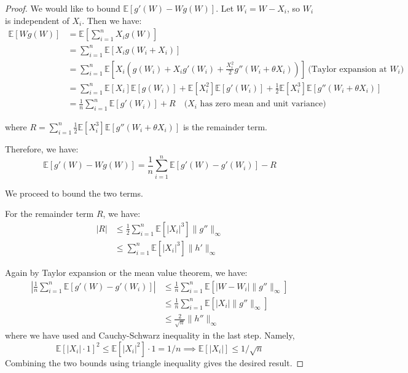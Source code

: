 \documentclass{article}
\begin{document}
\begin{proof}
    We would like to bound $\mathbb{E}[g'(W)-Wg(W)]$. Let $W_i = W - X_i$, so $W_i$ is independent of $X_i$. Then we have:
    \begin{align*}
        \mathbb{E}[Wg(W)] &= \mathbb{E}[\sum_{i=1}^{n} X_i g(W)]\\
        &= \sum_{i=1}^{n} \mathbb{E}[X_i g(W_i + X_i)]\\
        &= \sum_{i=1}^{n} \mathbb{E}[X_i (g(W_i) + X_i g'(W_i) + \frac{X_i^2}{2} g''(W_i +\theta X_i))] \ \text{(Taylor expansion at $W_i$)}
        \\
        &= \sum_{i=1}^{n} \mathbb{E}[X_i] \mathbb{E}[g(W_i)] + \mathbb{E}[X_i^2] \mathbb{E}[g'(W_i)] + \frac{1}{2} \mathbb{E}[X_i^3] \mathbb{E}[g''(W_i +\theta X_i)]\\
        &= \frac{1}{n} \sum_{i=1}^{n} \mathbb{E}[g'(W_i)] + R \quad \text{($X_i$ has zero mean and unit variance)}
    \end{align*}

    where $R = \sum_{i=1}^{n}\frac{1}{2} \mathbb{E}[X_i^3] \mathbb{E}[g''(W_i +\theta X_i)]$ is the remainder term. 

    Therefore, we have:
    \begin{equation*}
        \mathbb{E}[g'(W)-Wg(W)] = \frac{1}{n} \sum_{i=1}^{n} \mathbb{E}[g'(W) -g'(W_i)] - R
    \end{equation*}

    We proceed to bound the two terms.  
    
    For the remainder term $R$, we have:
    \begin{align*}
        |R| &\leq \frac{1}{2} \sum_{i=1}^{n} \mathbb{E}[|X_i|^3] \|g''\|_\infty\\
        &\leq \sum_{i=1}^{n} \mathbb{E}[|X_i|^3] \|h'\|_\infty
    \end{align*}
    

    Again by Taylor expansion or the mean value theorem, we have:
    \begin{align*}
        \left|\frac{1}{n} \sum_{i=1}^{n} \mathbb{E}[g'(W) -g'(W_i)]\right| &\leq \frac{1}{n} \sum_{i=1}^{n} \mathbb{E}[|W-W_i| \|g''\|_\infty]\\ 
        &\leq \frac{1}{n} \sum_{i=1}^{n} \mathbb{E}[|X_i| \|g''\|_\infty] \\
        &\leq \frac{2}{\sqrt{n}} \|h''\|_\infty
    \end{align*}
    where we have used  and Cauchy-Schwarz inequality in the last step. Namely, 
    \[
        \mathbb{E}[|X_i| \cdot 1]^2 \leq \mathbb{E}[|X_i|^2] \cdot 1=1/n \implies \mathbb{E}[|X_i|]\leq 1/\sqrt{n}
    \] 
    Combining the two bounds using triangle inequality gives the desired result.
\end{proof}
\end{document}
